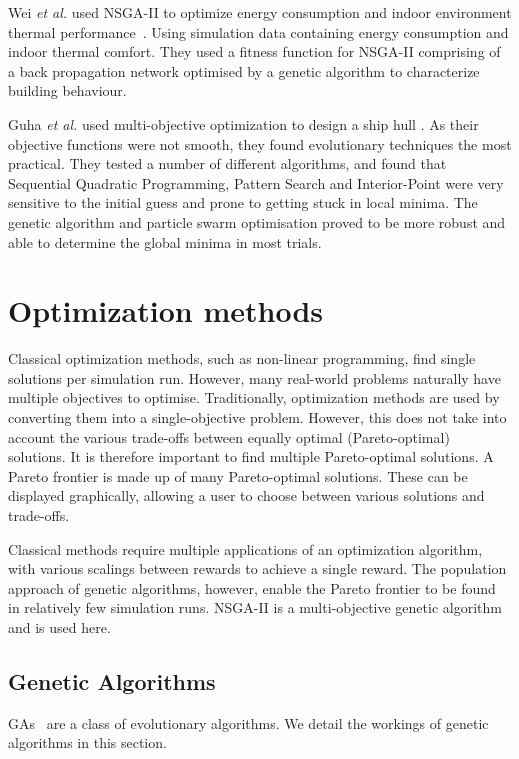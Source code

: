 \documentclass[10pt, conference, compsocconf]{IEEEtran}
\begin{document}
Wei \textit{et al.} used NSGA-II to optimize energy consumption and indoor environment thermal performance~\cite{Yu2015a}. Using simulation data containing energy consumption and indoor thermal comfort. They used a fitness function for NSGA-II comprising of a back propagation network optimised by a genetic algorithm to characterize building behaviour.

Guha \textit{et al.} used multi-objective optimization to design a ship hull \cite{Guha2015}. As their objective functions were not smooth, they found evolutionary techniques the most practical. They tested a number of different algorithms, and found that Sequential Quadratic Programming, Pattern Search and Interior-Point were very sensitive to the initial guess and prone to getting stuck in local minima. The genetic algorithm and particle swarm optimisation proved to be more robust and able to determine the global minima in most trials.

\section{Optimization methods}
\label{method}
Classical optimization methods, such as non-linear programming, find single solutions per simulation run. However, many real-world problems naturally have multiple objectives to optimise. Traditionally, optimization methods are used by converting them into a single-objective problem. However, this does not take into account the various trade-offs between equally optimal (Pareto-optimal) solutions. It is therefore important to find multiple Pareto-optimal solutions. A Pareto frontier is made up of many Pareto-optimal solutions. These can be displayed graphically, allowing a user to choose between various solutions and trade-offs.

Classical methods require multiple applications of an optimization algorithm, with various scalings between rewards to achieve a single reward. The population approach of genetic algorithms, however, enable the Pareto frontier to be found in relatively few simulation runs. NSGA-II is a multi-objective genetic algorithm and is used here.

\subsection{Genetic Algorithms}
GAs~\cite{Holland1975} are a class of evolutionary algorithms. We detail the workings of genetic algorithms in this section.
\end{document}
